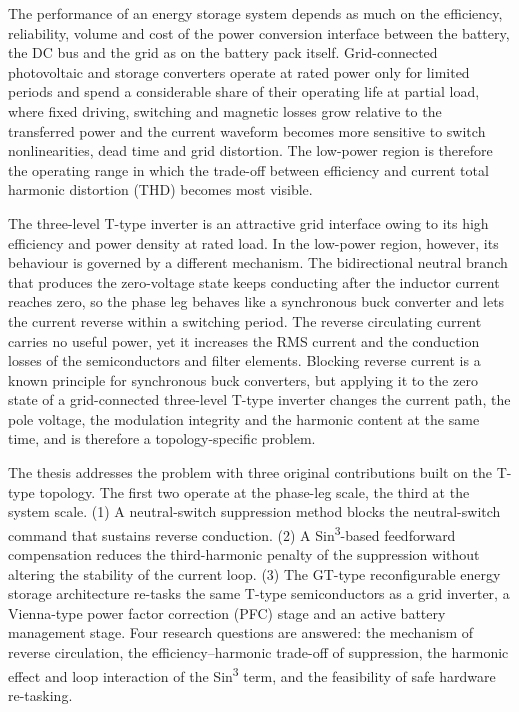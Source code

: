 \begin{summary}
The performance of an energy storage system depends as much on the efficiency, reliability, volume and cost of the power conversion interface between the battery, the DC bus and the grid as on the battery pack itself. Grid-connected photovoltaic and storage converters operate at rated power only for limited periods and spend a considerable share of their operating life at partial load, where fixed driving, switching and magnetic losses grow relative to the transferred power and the current waveform becomes more sensitive to switch nonlinearities, dead time and grid distortion. The low-power region is therefore the operating range in which the trade-off between efficiency and current total harmonic distortion (THD) becomes most visible.

The three-level T-type inverter is an attractive grid interface owing to its high efficiency and power density at rated load. In the low-power region, however, its behaviour is governed by a different mechanism. The bidirectional neutral branch that produces the zero-voltage state keeps conducting after the inductor current reaches zero, so the phase leg behaves like a synchronous buck converter and lets the current reverse within a switching period. The reverse circulating current carries no useful power, yet it increases the RMS current and the conduction losses of the semiconductors and filter elements. Blocking reverse current is a known principle for synchronous buck converters, but applying it to the zero state of a grid-connected three-level T-type inverter changes the current path, the pole voltage, the modulation integrity and the harmonic content at the same time, and is therefore a topology-specific problem.

The thesis addresses the problem with three original contributions built on the T-type topology. The first two operate at the phase-leg scale, the third at the system scale. (1) A neutral-switch suppression method blocks the neutral-switch command that sustains reverse conduction. (2) A Sin\textsuperscript{3}-based feedforward compensation reduces the third-harmonic penalty of the suppression without altering the stability of the current loop. (3) The GT-type reconfigurable energy storage architecture re-tasks the same T-type semiconductors as a grid inverter, a Vienna-type power factor correction (PFC) stage and an active battery management stage. Four research questions are answered: the mechanism of reverse circulation, the efficiency--harmonic trade-off of suppression, the harmonic effect and loop interaction of the Sin\textsuperscript{3} term, and the feasibility of safe hardware re-tasking.


\end{summary}
